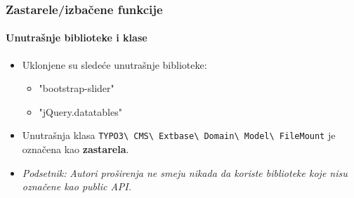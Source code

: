 \begin{frame}[fragile]
	\frametitle{Zastarele/izbačene funkcije}
	\framesubtitle{Unutrašnje biblioteke i klase}

	\begin{itemize}
		\item Uklonjene su sledeće unutrašnje biblioteke:
			\begin{itemize}
				\item "bootstrap-slider"
				\item "jQuery.datatables"
			\end{itemize}
			\vspace{0.4cm}

		\item Unutrašnja klasa \small\texttt{TYPO3\textbackslash
			CMS\textbackslash
			Extbase\textbackslash
			Domain\textbackslash
			Model\textbackslash
			FileMount}\normalsize\newline
			je označena kao \textbf{zastarela}.

	\end{itemize}

	\vspace{0.6cm}
	\begin{itemize}
		\item[\ding{228}] \textit{Podsetnik:} \textit{Autori proširenja ne smeju nikada da koriste biblioteke koje nisu označene kao public API.}
	\end{itemize}

\end{frame}


